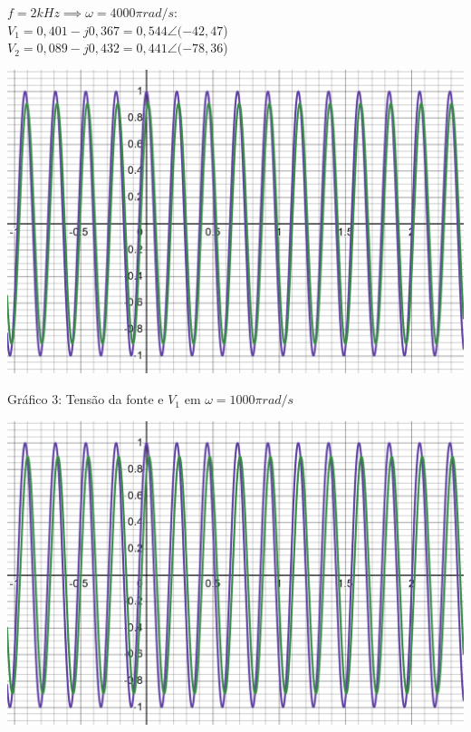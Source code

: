 \documentclass[a4 paper]{article}
\begin{document}
$f=2kHz\implies \omega = 4000\pi rad/s:$\\\centering
$V_1=0,401-j0,367=0,544\angle(-42,47$\textdegree)\\
$V_2=0,089-j0,432=0,441\angle(-78,36$\textdegree)\\
\justifying

\newpage
\begin{table}[h]
\centering
\includegraphics[scale=0.25]{rgadicoas/grafico2}
\end{table}

\begin{center}
Gráfico 3: Tensão da fonte e $V_1$ em $\omega =1000\pi rad/s$
\end{center}

\vspace{30pt}
\begin{table}[h]
\centering
\includegraphics[scale=0.25]{rgadicoas/grafico6}
\end{table}
\end{document}
